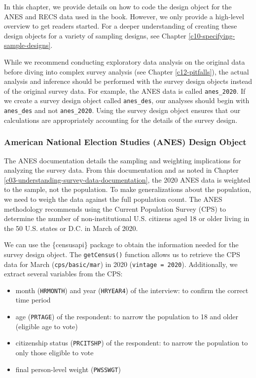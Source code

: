 \documentclass[
]{krantz}
\providecommand{\tightlist}{%
  \setlength{\itemsep}{0pt}\setlength{\parskip}{0pt}}
\begin{document}
In this chapter, we provide details on how to code the design object for the ANES and RECS data used in the book. However, we only provide a high-level overview to get readers started. For a deeper understanding of creating these design objects for a variety of sampling designs, see Chapter \ref{c10-specifying-sample-designs}.

While we recommend conducting exploratory data analysis on the original data before diving into complex survey analysis (see Chapter \ref{c12-pitfalls}), the actual analysis and inference should be performed with the survey design objects instead of the original survey data. For example, the ANES data is called \texttt{anes\_2020}. If we create a survey design object called \texttt{anes\_des}, our analyses should begin with \texttt{anes\_des} and not \texttt{anes\_2020}. Using the survey design object ensures that our calculations are appropriately accounting for the details of the survey design.

\hypertarget{american-national-election-studies-anes-design-object}{%
\subsubsection*{American National Election Studies (ANES) Design Object}\label{american-national-election-studies-anes-design-object}}


The ANES documentation \citep{debell} details the sampling and weighting implications for analyzing the survey data. From this documentation and as noted in Chapter \ref{c03-understanding-survey-data-documentation}, the 2020 ANES data is weighted to the sample, not the population. To make generalizations about the population, we need to weigh the data against the full population count. The ANES methodology recommends using the Current Population Survey (CPS) to determine the number of non-institutional U.S. citizens aged 18 or older living in the 50 U.S. states or D.C. in March of 2020.

We can use the \{censusapi\} package to obtain the information needed for the survey design object. The \texttt{getCensus()} function allows us to retrieve the CPS data for March (\texttt{cps/basic/mar}) in 2020 (\texttt{vintage\ =\ 2020}). Additionally, we extract several variables from the CPS:

\begin{itemize}
\tightlist
\item
  month (\texttt{HRMONTH}) and year (\texttt{HRYEAR4}) of the interview: to confirm the correct time period
\item
  age (\texttt{PRTAGE}) of the respondent: to narrow the population to 18 and older (eligible age to vote)
\item
  citizenship status (\texttt{PRCITSHP}) of the respondent: to narrow the population to only those eligible to vote
\item
  final person-level weight (\texttt{PWSSWGT})
\end{itemize}
\end{document}
